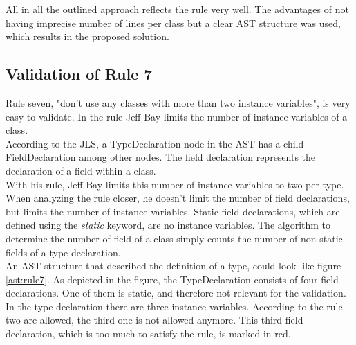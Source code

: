 All in all the outlined approach reflects the rule very well. The advantages of not having imprecise number of lines per class but a clear \ac{AST} structure was used, which results in the proposed solution.

\subsection*{Validation of Rule 7}
Rule seven, "don’t use any classes with more than two instance variables", is very easy to validate. In the rule Jeff Bay limits the number of instance variables of a class. 
\\

According to the \ac{JLS}, a TypeDeclaration node in the \ac{AST} has  a child FieldDeclaration among other nodes. The field declaration represents the declaration of a field within a class. 
\\

With his rule, Jeff Bay limits this number of instance variables to two per type. When analyzing the rule closer, he doesn't limit the number of field declarations, but limits the number of instance variables. Static field declarations, which are defined using the \textit{static} keyword, are no instance variables. The algorithm to determine the number of field of a class simply counts the number of non-static fields of a type declaration. 
\\

An \ac{AST} structure that described the definition of a type, could look like figure \ref{ast:rule7}. As depicted in the figure, the TypeDeclaration consists of four field declarations. One of them is static, and therefore not relevant for the validation. In the type declaration there are three instance variables. According to the rule two are allowed, the third one is not allowed anymore. This third field declaration, which is too much to satisfy the rule, is marked in red.
\\

\label{ast:rule7}

